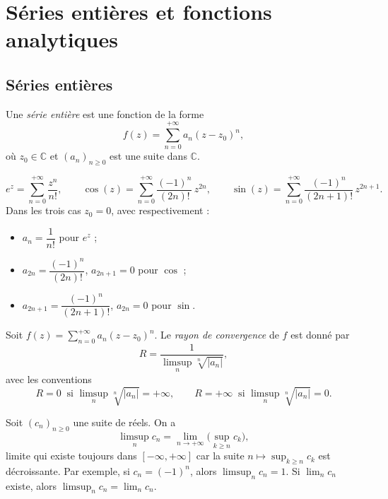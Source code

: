 \setcounter{section}{2}
\section{Séries entières et fonctions analytiques}

\subsection{Séries entières}

\begin{definition}
Une \emph{série entière} est une fonction de la forme
\[
f(z) = \sum_{n=0}^{+\infty} a_n (z - z_0)^n ,
\]
où $z_0 \in \mathbb{C}$ et $(a_n)_{n \geq 0}$ est une suite dans $\mathbb{C}$.
\end{definition}

\begin{exemple}
\[
e^z = \sum_{n=0}^{+\infty} \frac{z^n}{n!}, \qquad
\cos(z) = \sum_{n=0}^{+\infty} \frac{(-1)^n}{(2n)!}\, z^{2n}, \qquad
\sin(z) = \sum_{n=0}^{+\infty} \frac{(-1)^n}{(2n+1)!}\, z^{2n+1}.
\]
Dans les trois cas $z_0 = 0$, avec respectivement :
\begin{itemize}
  \item $a_n = \dfrac{1}{n!}$ pour $e^z$ ;
  \item $a_{2n} = \dfrac{(-1)^n}{(2n)!}$, $a_{2n+1} = 0$ pour $\cos$ ;
  \item $a_{2n+1} = \dfrac{(-1)^n}{(2n+1)!}$, $a_{2n} = 0$ pour $\sin$.
\end{itemize}
\end{exemple}

\begin{definition}
Soit $f(z) = \displaystyle\sum_{n=0}^{+\infty} a_n (z-z_0)^n$. Le \emph{rayon de convergence} de $f$ est donné par
\[
R = \frac{1}{\limsup\limits_{n} \sqrt[n]{|a_n|}} ,
\]
avec les conventions
\[
R = 0 \ \text{ si } \limsup_n \sqrt[n]{|a_n|} = +\infty,
\qquad
R = +\infty \ \text{ si } \limsup_n \sqrt[n]{|a_n|} = 0 .
\]
\end{definition}

\begin{remarque}
Soit $(c_n)_{n \geq 0}$ une suite de réels. On a
\[
\limsup_n c_n = \lim_{n \to +\infty} \Big( \sup_{k \geq n} c_k \Big),
\]
limite qui existe toujours dans $[-\infty, +\infty]$ car la suite $n \mapsto \sup_{k \geq n} c_k$ est décroissante.
Par exemple, si $c_n = (-1)^n$, alors $\limsup_n c_n = 1$.
Si $\lim_n c_n$ existe, alors $\limsup_n c_n = \lim_n c_n$.
\end{remarque}

